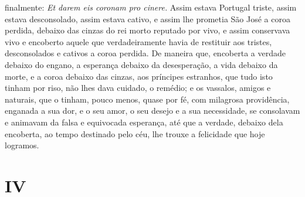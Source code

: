 finalmente: \emph{Et darem eis coronam pro cinere.} Assim
estava Portugal triste, assim estava desconsolado, assim estava cativo,
e assim lhe prometia São José a coroa perdida, debaixo das cinzas do rei
morto reputado por vivo, e assim conservava vivo e encoberto aquele que
verdadeiramente havia de
restituir aos tristes, desconsolados e cativos a coroa perdida. De
maneira que, encoberta a verdade debaixo do engano, a esperança debaixo
da desesperação, a vida debaixo da morte, e a coroa debaixo das cinzas,
aos príncipes estranhos, que tudo isto tinham por riso, não lhes dava
cuidado, o remédio; e os vassalos, amigos e naturais, que o tinham,
pouco menos, quase por fé, com milagrosa providência, enganada a sua
dor, e o seu amor, o seu desejo e a sua necessidade, se consolavam e
animavam da falsa e equivocada esperança, até que a verdade, debaixo
dela encoberta, ao tempo destinado pelo céu, lhe trouxe a felicidade que
hoje logramos.

\section*{IV}

